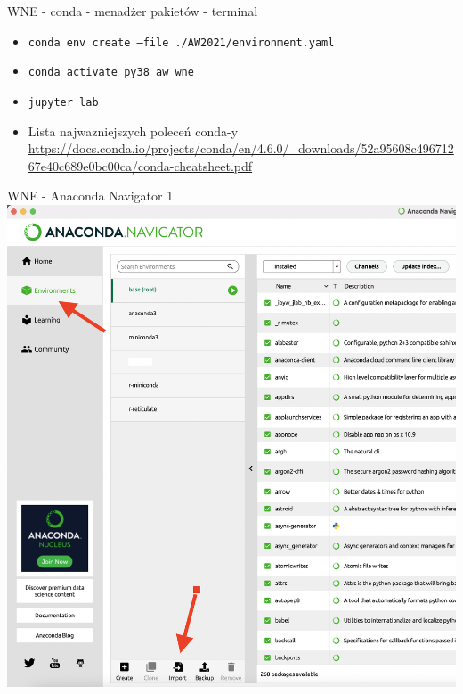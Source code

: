 \documentclass{beamer}
\begin{document}
\begin{frame}{WNE - conda - menadżer pakietów - terminal}
\begin{itemize}
  \item \texttt{conda env create --file ./AW2021/environment.yaml}
  \item \texttt{conda activate py38\_aw\_wne}
  \item \texttt{jupyter lab}
  \item Lista najwazniejszych poleceń conda-y \url{https://docs.conda.io/projects/conda/en/4.6.0/_downloads/52a95608c49671267e40c689e0bc00ca/conda-cheatsheet.pdf}
  \end{itemize}
\end{frame}

\begin{frame}{WNE - Anaconda Navigator 1}
  \includegraphics[scale = 0.20]{anaconda_navigator_1.png}
\end{frame}
\end{document}
